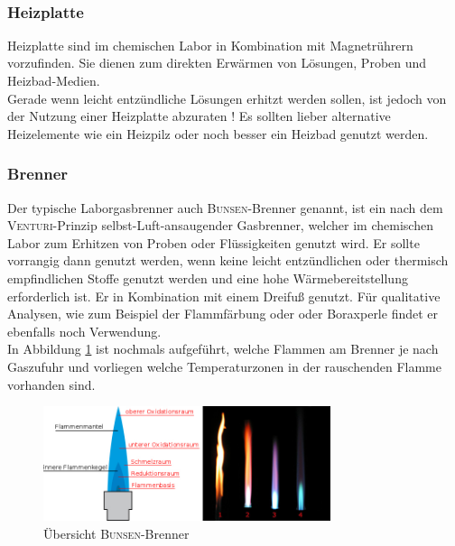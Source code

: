 \\

\subsubsection*{Heizplatte}
Heizplatte sind im chemischen Labor in Kombination mit Magnetrührern vorzufinden. Sie dienen zum direkten Erwärmen von Lösungen, Proben und Heizbad-Medien. \\
Gerade wenn leicht entzündliche Lösungen erhitzt werden sollen, ist jedoch von der Nutzung einer Heizplatte abzuraten ! Es sollten lieber alternative Heizelemente wie ein Heizpilz oder noch besser ein Heizbad genutzt werden.

\subsubsection*{Brenner}
Der typische Laborgasbrenner auch \textsc{Bunsen}-Brenner genannt, ist ein nach dem \textsc{Venturi}-Prinzip selbst-Luft-ansaugender Gasbrenner, welcher im chemischen Labor zum Erhitzen von Proben oder Flüssigkeiten genutzt wird.  Er sollte vorrangig dann genutzt werden, wenn keine leicht entzündlichen oder thermisch empfindlichen Stoffe genutzt werden und eine hohe Wärmebereitstellung erforderlich ist. Er in Kombination mit einem Dreifuß genutzt. Für qualitative Analysen, wie zum Beispiel der Flammfärbung oder oder Boraxperle findet er ebenfalls noch Verwendung.\\
In Abbildung \ref{fig:brenner} ist nochmals aufgeführt, welche Flammen am Brenner je nach Gaszufuhr und vorliegen welche Temperaturzonen in der rauschenden Flamme vorhanden sind.\\

\begin{figure}[h!]
	\centering
	\includegraphics[width=0.75\textwidth]{img/brennerflamme3}
	\caption{Übersicht \textsc{Bunsen}-Brenner}
	\label{fig:brenner}
\end{figure}
\FloatBarrier

